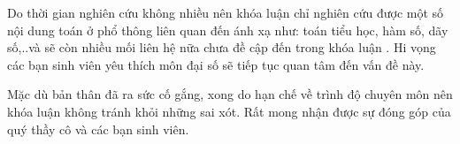 \documentclass[12pt,oneside,a4paper,reqno]{book}
\begin{document}
\medskip
Do thời gian nghiên cứu không nhiều nên khóa luận chỉ nghiên cứu được một số nội dung toán ở phổ thông liên quan đến ánh xạ như: toán tiểu học, hàm số, dãy số,..và sẽ còn nhiều mối liên hệ nữa chưa đề cập đến trong khóa luận . Hi vọng các bạn sinh viên yêu thích môn đại số sẽ tiếp tục quan tâm đến vấn đề này.

\medskip
Mặc dù bản thân đã ra sức cố gắng, xong do hạn chế về trình độ chuyên môn nên khóa luận không tránh khỏi những sai xót. Rất mong nhận được sự đóng góp của quý thầy cô và các bạn sinh viên.
%	
\newpage



 
 
  
 
\end{document}
